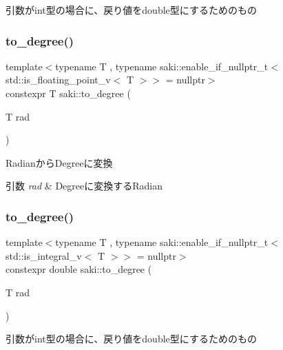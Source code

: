 引数がint型の場合に、戻り値をdouble型にするためのもの 

\mbox{\label{namespacesaki_af9f6d8f2c0663a0452c7edd17bf5daf0}} 
\subsubsection{\texorpdfstring{to\+\_\+degree()}{to\_degree()}\hspace{0.1cm}{\footnotesize\ttfamily [1/2]}}
{\footnotesize\ttfamily template$<$typename T , typename saki\+::enable\+\_\+if\+\_\+nullptr\+\_\+t$<$ std\+::is\+\_\+floating\+\_\+point\+\_\+v$<$ T $>$$>$  = nullptr$>$ \\
constexpr T saki\+::to\+\_\+degree (\begin{DoxyParamCaption}\item[{T}]{rad }\end{DoxyParamCaption})}



Radianから\+Degreeに変換 


\begin{DoxyParams}{引数}
{\em rad} & Degreeに変換する\+Radian \\
\hline
\end{DoxyParams}
\mbox{\label{namespacesaki_aa7cb33956f8d7354b485aee878d7805d}} 
\subsubsection{\texorpdfstring{to\+\_\+degree()}{to\_degree()}\hspace{0.1cm}{\footnotesize\ttfamily [2/2]}}
{\footnotesize\ttfamily template$<$typename T , typename saki\+::enable\+\_\+if\+\_\+nullptr\+\_\+t$<$ std\+::is\+\_\+integral\+\_\+v$<$ T $>$$>$  = nullptr$>$ \\
constexpr double saki\+::to\+\_\+degree (\begin{DoxyParamCaption}\item[{T}]{rad }\end{DoxyParamCaption})}



引数がint型の場合に、戻り値をdouble型にするためのもの 

\mbox{\label{namespacesaki_a27595b1e53058ce792db7f8d29e2e9af}} 
